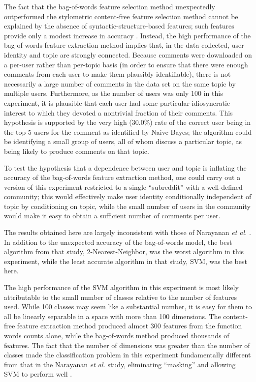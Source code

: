 \documentclass{article}
\begin{document}
The fact that the bag-of-words feature selection method unexpectedly outperformed the stylometric content-free feature selection method cannot be explained by the absence of syntactic-structure-based features; such features provide only a modest increase in accuracy \cite{narayanan2012feasibility}. Instead, the high performance of the bag-of-words feature extraction method implies that, in the data collected, user identity and topic are strongly connected. Because comments were downloaded on a per-user rather than per-topic basis (in order to ensure that there were enough comments from each user to make them plausibly identifiable), there is not necessarily a large number of comments in the data set on the same topic by multiple users. Furthermore, as the number of users was only 100 in this experiment, it is plausible that each user had some particular idiosyncratic interest to which they devoted a nontrivial fraction of their comments. This hypothesis is supported by the very high (30.0\%) rate of the correct user being in the top 5 users for the comment as identified by Naive Bayes; the algorithm could be identifying a small group of users, all of whom discuss a particular topic, as being likely to produce comments on that topic. 

To test the hypothesis that a dependence between user and topic is inflating the accuracy of the bag-of-words feature extraction method, one could carry out a version of this experiment restricted to a single ``subreddit'' with a well-defined community; this would effectively make user identity conditionally independent of topic by conditioning on topic, while the small number of users in the community would make it easy to obtain a sufficient number of comments per user.

The results obtained here are largely inconsistent with those of Narayanan \textit{et al.} \cite{narayanan2012feasibility}. In addition to the unexpected accuracy of the bag-of-words model, the best algorithm from that study, 2-Nearest-Neighbor, was the worst algorithm in this experiment, while the least accurate algorithm in that study, SVM, was the best here.

The high performance of the SVM algorithm in this experiment is most likely attributable to the small number of classes relative to the number of features used. While 100 classes may seem like a substantial number, it is easy for them to all be linearly separable in a space with more than 100 dimensions. The content-free feature extraction method produced almost 300 features from the function words counts alone, while the bag-of-words method produced thousands of features. The fact that the number of dimensions was greater than the number of classes made the classification problem in this experiment fundamentally different from that in the Narayanan \textit{et al.} study, eliminating ``masking'' and allowing SVM to perform well \cite{narayanan2012feasibility}.
\end{document}
